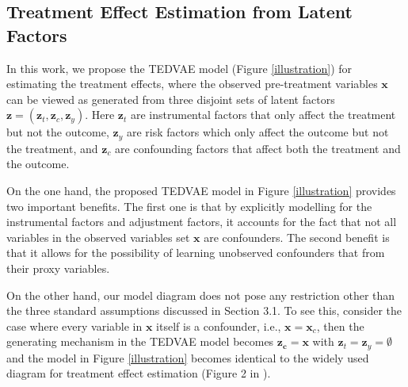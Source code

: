 \documentclass[letterpaper]{article} %
\begin{document}

\subsection*{Treatment Effect Estimation from Latent Factors}
%
%
%


In this work, we propose the TEDVAE model (Figure \ref{illustration}) for estimating the treatment effects, where the observed pre-treatment variables $\mathbf{x}$ can be viewed as generated from three disjoint sets of latent factors $\mathbf{z} = (\mathbf{z}_t,\mathbf{z}_c, \mathbf{z}_y)$.
Here $\mathbf{z}_t$ are instrumental factors that only affect the treatment but not the outcome,
$\mathbf{z}_y$ are risk factors which only affect the outcome but not the treatment,
and $\mathbf{z}_c$ are confounding factors that affect both the treatment and the outcome.

On the one hand, the proposed TEDVAE model in Figure \ref{illustration} provides two important benefits. The first one is that by explicitly modelling for the instrumental factors and adjustment factors, it accounts for the fact that not all variables in the observed variables set $\mathbf{x}$ are confounders. The second benefit is that it allows for the possibility of learning unobserved confounders that from their proxy variables.

On the other hand, our model diagram does not pose any restriction other than the three standard assumptions discussed in Section 3.1.
To see this, consider the case where every variable in $\mathbf{x}$ itself is a confounder, i.e., $\mathbf{x}=\mathbf{x}_c$, then the generating mechanism in the TEDVAE model becomes $\mathbf{z_c} = \mathbf{x}$ with $\mathbf{z}_t=\mathbf{z}_y=\emptyset$ and the model in Figure \ref{illustration} becomes identical to the widely used diagram for treatment effect estimation (Figure 2 in \cite{Imbens2019}).
\end{document}
